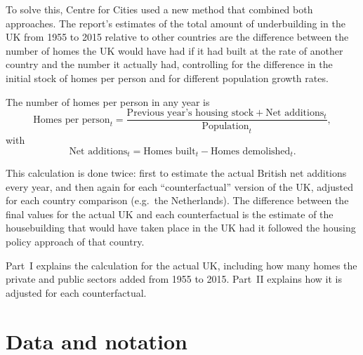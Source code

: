 \documentclass[11pt,a4paper]{article}
\begin{document}
To solve this, Centre for Cities used a new method that combined both approaches. The
report's estimates of the total amount of underbuilding in the UK from 1955 to 2015
relative to other countries are the difference between the number of homes the UK would
have had if it had built at the rate of another country and the number it actually had,
controlling for the difference in the initial stock of homes per person and for
different population growth rates.

The number of homes per person in any year is
\[
  \text{Homes per person}_t
  = \frac{\text{Previous year's housing stock} + \text{Net additions}_t}{\text{Population}_t},
\]
with
\[
  \text{Net additions}_t = \text{Homes built}_t - \text{Homes demolished}_t.
\]

This calculation is done twice: first to estimate the actual British net additions every
year, and then again for each ``counterfactual'' version of the UK, adjusted for each
country comparison (e.g.\ the Netherlands). The difference between the final values for
the actual UK and each counterfactual is the estimate of the housebuilding that would have
taken place in the UK had it followed the housing policy approach of that country.

Part~I explains the calculation for the actual UK, including how many homes the private
and public sectors added from 1955 to 2015. Part~II explains how it is adjusted for each
counterfactual.

\section*{Data and notation}
\end{document}
